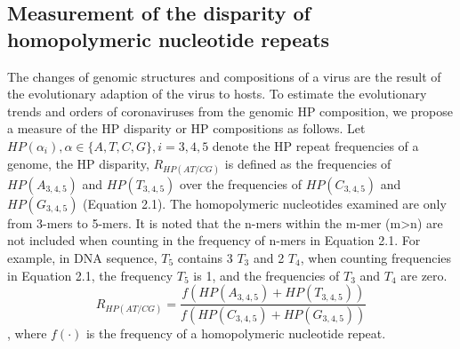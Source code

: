 \documentclass{article}
\numberwithin{equation}{section}
\begin{document}
\subsection{Measurement of the disparity of homopolymeric nucleotide repeats}
The changes of genomic structures and compositions of a virus are the result of the evolutionary adaption of the virus to hosts. To estimate the evolutionary trends and orders of coronaviruses from the genomic HP composition, we propose a measure of the HP disparity or HP compositions as follows. Let $HP(\alpha _i),\alpha  \in \{ A,T,C,G\} ,i = 3,4,5$ denote the HP repeat frequencies of a genome, the HP disparity, $R_{HP(AT/CG)}$  is defined as the frequencies of $HP(A_{3,4,5})$ and $HP(T_{3,4,5})$ over the frequencies of $HP(C_{3,4,5})$ and $HP(G_{3,4,5})$ (Equation 2.1). The homopolymeric nucleotides examined are only from 3-mers to 5-mers. It is noted that the n-mers within the m-mer (m>n) are not included when counting in the frequency of n-mers in Equation 2.1. For example, in DNA sequence, $T_{5}$ contains 3 $T_{3}$ and 2 $T_{4}$, when counting frequencies in Equation 2.1, the frequency $T_{5}$ is 1, and the frequencies of $T_{3}$ and $T_{4}$ are zero.
\begin{equation}
R_{HP(AT/CG)}  = \frac{{f(HP(A_{3,4,5} ) + HP(T_{3,4,5} ))}}
{{f(HP(C_{3,4,5} ) + HP(G_{3,4,5} ))}}
\end{equation}
, where $f( \cdot )$ is the frequency of a homopolymeric nucleotide repeat.
\end{document}
